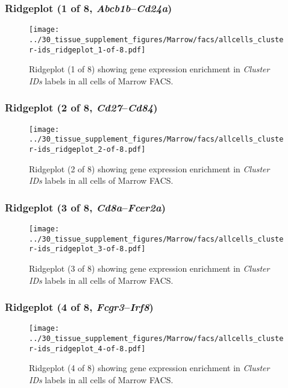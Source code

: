 \clearpage

\subsubsection{Ridgeplot (1 of 8, \emph{Abcb1b}--\emph{Cd24a})}
\begin{figure}[h]
\centering
\texttt{[image: ../30\_tissue\_supplement\_figures/Marrow/facs/allcells\_cluster-ids\_ridgeplot\_1-of-8.pdf]}

\caption{ Ridgeplot (1 of 8)  showing gene expression enrichment in \emph{Cluster IDs} labels in all cells of Marrow FACS. }
\end{figure}


\clearpage

\subsubsection{Ridgeplot (2 of 8, \emph{Cd27}--\emph{Cd84})}
\begin{figure}[h]
\centering
\texttt{[image: ../30\_tissue\_supplement\_figures/Marrow/facs/allcells\_cluster-ids\_ridgeplot\_2-of-8.pdf]}

\caption{ Ridgeplot (2 of 8)  showing gene expression enrichment in \emph{Cluster IDs} labels in all cells of Marrow FACS. }
\end{figure}


\clearpage

\subsubsection{Ridgeplot (3 of 8, \emph{Cd8a}--\emph{Fcer2a})}
\begin{figure}[h]
\centering
\texttt{[image: ../30\_tissue\_supplement\_figures/Marrow/facs/allcells\_cluster-ids\_ridgeplot\_3-of-8.pdf]}

\caption{ Ridgeplot (3 of 8)  showing gene expression enrichment in \emph{Cluster IDs} labels in all cells of Marrow FACS. }
\end{figure}


\clearpage

\subsubsection{Ridgeplot (4 of 8, \emph{Fcgr3}--\emph{Irf8})}
\begin{figure}[h]
\centering
\texttt{[image: ../30\_tissue\_supplement\_figures/Marrow/facs/allcells\_cluster-ids\_ridgeplot\_4-of-8.pdf]}

\caption{ Ridgeplot (4 of 8)  showing gene expression enrichment in \emph{Cluster IDs} labels in all cells of Marrow FACS. }
\end{figure}


